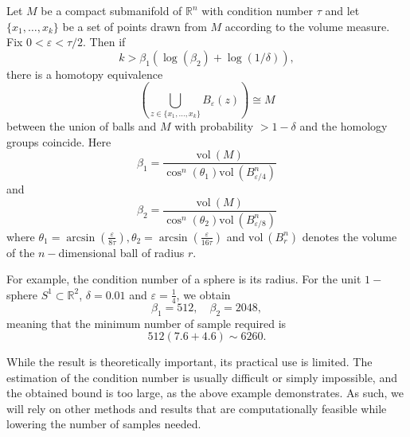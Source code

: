 \begin{theorem}
  Let $M$ be a compact submanifold of $\mathbb{R}^{n}$ with condition number $\tau$ and let $\{x_{1}, \ldots, x_{k}\}$ be a set of points drawn from $M$ according to the volume measure. Fix $0 < \varepsilon < \tau/2$. Then if
  \begin{equation*}
    k > \beta_{1}\left(\log(\beta_{2}) + \log(1/\delta) \right),
  \end{equation*}
  there is a homotopy equivalence
  \begin{equation*}
    \left(\bigcup_{z \in \{x_{1}, \ldots, x_{k}\}} B_{\varepsilon}(z) \right) \cong M
  \end{equation*}
  between the union of balls and $M$ with probability $> 1 - \delta$ and the homology groups coincide. Here
  \begin{equation*}
    \beta_{1} = \frac{\text{vol}\:(M)}{\cos^{n}(\theta_{1})\text{vol}\:(B^{n}_{\varepsilon/4})}
  \end{equation*}
  and
  \begin{equation*}
    \beta_{2} = \frac{\text{vol}\:(M)}{\cos^{n}(\theta_{2})\text{vol}\:(B^{n}_{\varepsilon/8})}
  \end{equation*}
  where $\theta_{1} = \arcsin(\frac{\varepsilon}{8\tau}), \theta_{2} = \arcsin(\frac{\varepsilon}{16\tau})$ and $\text{vol}\:(B^{n}_{r})$
  denotes the volume of the $n-$dimensional ball of radius $r$.
\end{theorem}

For example, the condition number of a sphere is its radius. For the unit $1-$sphere $S^{1} \subset \mathbb{R}^{2}$, $\delta = 0.01$ and $\varepsilon = \frac{1}{4}$, we obtain
\begin{equation*}
  \beta_{1} = 512, \quad \beta_{2} = 2048,
\end{equation*}
meaning that the minimum number of sample required is
\begin{equation*}
  512(7.6 + 4.6) \sim 6260.
\end{equation*}

While the result is theoretically important, its practical use is limited. The estimation of the condition number is usually difficult or simply impossible, and the obtained bound is too large, as the above example demonstrates. As such, we will rely on other methods and results that are computationally feasible while lowering the number of samples needed.
